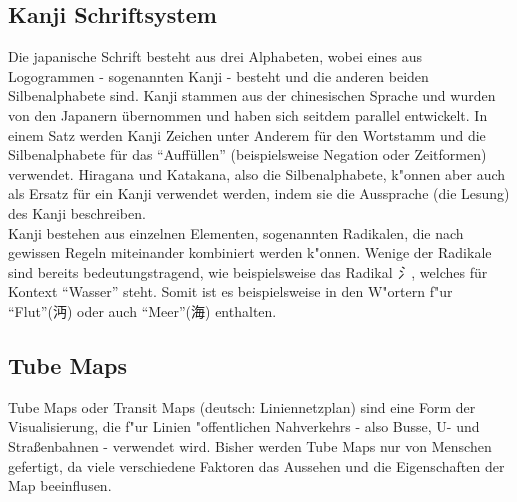 \subsection{Kanji Schriftsystem}
Die japanische Schrift besteht aus drei Alphabeten, wobei eines aus Logogrammen - sogenannten Kanji - besteht und die anderen beiden Silbenalphabete sind. Kanji stammen aus der chinesischen Sprache und wurden von den Japanern übernommen und haben sich seitdem parallel entwickelt. In einem Satz werden Kanji Zeichen unter Anderem für den Wortstamm und die Silbenalphabete für das "`Auffüllen"' (beispielsweise Negation oder Zeitformen) verwendet. Hiragana und Katakana, also die Silbenalphabete, k"onnen aber auch als Ersatz für ein Kanji verwendet werden, indem sie die Aussprache (die Lesung) des Kanji beschreiben. \\
Kanji bestehen aus einzelnen Elementen, sogenannten Radikalen, die nach gewissen Regeln miteinander kombiniert werden k"onnen. Wenige der Radikale sind bereits bedeutungstragend, wie beispielsweise das Radikal \emph{氵}, welches für Kontext "`Wasser"' steht. Somit ist es beispielsweise in den W"ortern f"ur "`Flut"'(沔) oder auch "`Meer"'(海) enthalten. 

\subsection{Tube Maps}
Tube Maps oder Transit Maps (deutsch: Liniennetzplan) sind eine Form der Visualisierung, die f"ur Linien "offentlichen Nahverkehrs - also Busse, U- und Straßenbahnen - verwendet wird. Bisher werden Tube Maps nur von Menschen gefertigt, da viele verschiedene Faktoren das Aussehen und die Eigenschaften der Map beeinflusen.  

